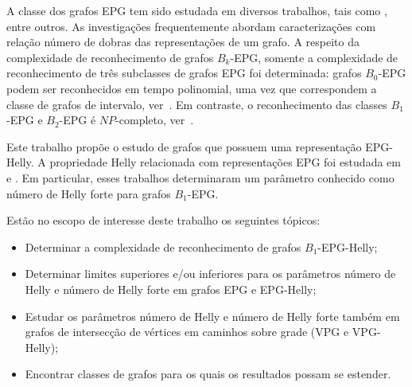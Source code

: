 A classe dos grafos EPG tem sido estudada em diversos trabalhos, tais como  \cite{alcon2016, Asinowski2009, cohen2014, golumbic2009, heldt2014,  martin2017}, entre outros. As investigações frequentemente abordam caracterizações com relação número de dobras das representações de um grafo. A respeito da complexidade de reconhecimento de grafos $B_k$-EPG, somente a complexidade de reconhecimento de três subclasses de grafos EPG foi determinada:
 grafos $B_0$-EPG podem ser reconhecidos em tempo polinomial, uma vez que correspondem a classe de grafos de intervalo, ver~\cite{booth1976, golumbic2009}. Em contraste, o reconhecimento das classes $B_1$-EPG e $B_2$-EPG é $NP$-completo, ver~\cite{heldt2014, martin2017}.







Este trabalho propõe o estudo de grafos que possuem uma representação EPG-Helly. 
A propriedade Helly relacionada com representações EPG foi  estudada em~\cite{golumbic2009} e \cite{golumbic2013}. Em particular, esses trabalhos determinaram um parâmetro conhecido como número de Helly forte  para grafos $B_1$-EPG. 

Estão no escopo de interesse deste trabalho os seguintes tópicos:

\begin{itemize}
    
    \item Determinar a complexidade de reconhecimento de grafos $B_1$-EPG-Helly;
    \item Determinar limites superiores e/ou inferiores para os parâmetros número de Helly e número de Helly forte em grafos EPG e EPG-Helly;
    
    \item Estudar os parâmetros número de Helly e número de Helly forte também em grafos de intersecção de vértices em caminhos sobre grade (VPG e VPG-Helly);
    
    \item Encontrar classes de grafos para os quais os resultados possam se estender.
\end{itemize}



